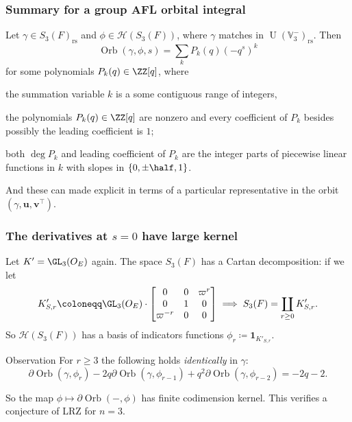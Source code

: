 \documentclass[11pt]{beamer}
\DeclareMathOperator{\Orb}{Orb}
\DeclareMathOperator{\U}{U}
\newcommand{\HH}{\mathcal{H}}
\newcommand{\VV}{\mathbb{V}}
\renewcommand{\OO}{O}
\newcommand{\guv}{{(\gamma, \uu, \vv^\top)}}
\newcommand{\rs}{_{\text{rs}}}
\newcommand{\uu}{\mathbf{u}}
\newcommand{\vv}{\mathbf{v}}
\begin{document}
\begin{frame}
  \frametitle{Summary for a group AFL orbital integral}
  \begin{theorem}[C.]
    Let $\gamma \in S_3(F)\rs$ and $\phi \in \HH(S_3(F))$,
    where $\gamma$ matches in $\U(\VV_3^-)\rs$.
    Then
    \[ \Orb(\gamma, \phi, s) = \sum_k P_k(q) (-q^s)^k \]
    for some polynomials $P_k(q) \in \ZZ[q]$, where
    \begin{itemize}
      \ii the summation variable $k$ is a some contiguous range of integers,

      \ii the polynomials $P_k(q) \in \ZZ[q]$ are nonzero and
      every coefficient of $P_k$ besides possibly the leading coefficient is $1$;

      \ii both $\deg P_k$ and leading coefficient of $P_k$ are the integer parts
      of piecewise linear functions in $k$ with slopes in $\{0, \pm\half, 1\}$.
    \end{itemize}
    And these can made explicit in terms of a particular representative in the orbit $\guv$.
  \end{theorem}
\end{frame}

\begin{frame}
  \frametitle{The derivatives at $s = 0$ have large kernel}
  \begin{itemize}
    \ii Let $K' = \GL_3(\OO_E)$ again.
    \ii The space $S_3(F)$ has a \alert{Cartan decomposition}: if we let
    \[ K'_{S,r} \coloneqq \GL_3(\OO_E) \cdot \begin{bmatrix} 0 & 0 & \varpi^r \\ 0 & 1 & 0 \\ \varpi^{-r} & 0 & 0 \end{bmatrix}
      \implies S_3(F) = \coprod_{r \geq 0} K'_{S,r}. \]
    \ii So $\HH(S_3(F))$ has a basis of indicators functions $\phi_r \coloneqq \mathbf{1}_{K'_{S, r}}. $
  \end{itemize}
  \begin{exampleblock}{Observation}
    For $r \ge 3$ the following holds \emph{identically} in $\gamma$:
    \[ \partial \Orb(\gamma, \phi_r)
      - 2q \partial \Orb(\gamma, \phi_{r-1})
      + q^2 \partial \Orb(\gamma, \phi_{r-2}) = -2q-2. \]
  \end{exampleblock}
  So the map $\phi \mapsto \partial \Orb(-, \phi)$ has finite codimension kernel.
  This verifies a conjecture of LRZ for $n = 3$.
\end{frame}
\end{document}
